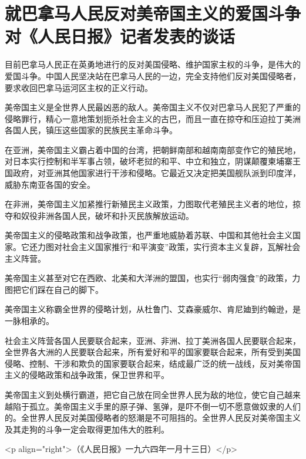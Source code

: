 \section[就巴拿马人民反对美帝国主义的爱国斗争对《人民日报》记者发表的谈话（一九六四年一月十二日）]{就巴拿马人民反对美帝国主义的爱国斗争对《人民日报》记者发表的谈话}


目前巴拿马人民正在英勇地进行的反对美国侵略、维护国家主权的斗争，是伟大的爱国斗争。中国人民坚决站在巴拿马人民的一边，完全支持他们反对美国侵略者，要求收回巴拿马运河区主权的正义行动。

美帝国主义是全世界人民最凶恶的敌人。美帝国主义不仅对巴拿马人民犯了严重的侵略罪行，精心一意地策划扼杀社会主义的古巴，而且一直在掠夺和压迫拉丁美洲各国人民，镇压这些国家的民族民主革命斗争。

在亚洲，美帝国主义霸占着中国的台湾，把朝鲜南部和越南南部变作它的殖民地，对日本实行控制和半军事占领，破坏老挝的和平、中立和独立，阴谋颠覆柬埔寨王国政府，对亚洲其他国家进行干涉和侵略。它最近又决定把美国舰队派到印度洋，威胁东南亚各国的安全。

在非洲，美帝国主义加紧推行新殖民主义政策，力图取代老殖民主义者的地位，掠夺和奴役非洲各国人民，破坏和扑灭民族解放运动。

美帝国主义的侵略政策和战争政策，也严重地威胁着苏联、中国和其他社会主义国家。它还力图对社会主义国家推行“和平演变”政策，实行资本主义复辟，瓦解社会主义阵营。

美帝国主义甚至对它在西欧、北美和大洋洲的盟国，也实行“弱肉强食”的政策，力图把它们踩在自己的脚下。

美帝国主义称霸全世界的侵略计划，从杜鲁门、艾森豪威尔、肯尼廸到约翰逊，是一脉相承的。

社会主义阵营各国人民要联合起来，亚洲、非洲、拉丁美洲各国人民要联合起来，全世界各大洲的人民要联合起来，所有爱好和平的国家要联合起来，所有受到美国侵略、控制、干涉和欺负的国家要联合起来，结成最广泛的统一战线，反对美帝国主义的侵略政策和战争政策，保卫世界和平。

美帝国主义到处横行霸道，把它自己放在同全世界人民为敌的地位，使它自己越来越陷于孤立。美帝国主义手里的原子弹、氢弹，是吓不倒一切不愿意做奴隶的人们的。全世界人民反对美国侵略者的怒潮是不可阻挡的。全世界人民反对美帝国主义及其走狗的斗争一定会取得更加伟大的胜利。

<p align="right">（《人民日报》一九六四年一月十三日）</p>


